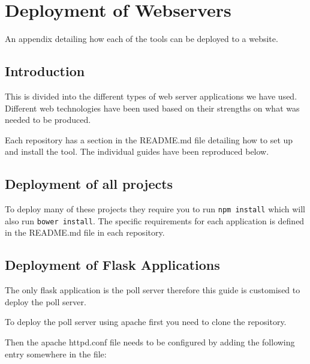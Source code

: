 \chapter{Deployment of Webservers} \label{App:Deployment of Webservers}
An appendix detailing how each of the tools can be deployed to a website.

\begin{preamble}
\end{preamble}

\section{Introduction}

This is divided into the different types of web server applications we have used. Different web technologies have been used based on their strengths on what was needed to be produced.

Each repository has a section in the README.md file detailing how to set up and install the tool. The individual guides have been reproduced below.

\section{Deployment of all projects}

To deploy many of these projects they require you to run \lstinline|npm install| which will also run \lstinline|bower install|. The specific requirements for each application is defined in the README.md file in each repository.

\section{Deployment of Flask Applications} \label{Section:Deployment Flask Applications}

The only flask application is the poll server therefore this guide is customised to deploy the poll server.

To deploy the poll server using apache first you need to clone the repository.

Then the apache httpd.conf file needs to be configured by adding the following entry somewhere in the file:

